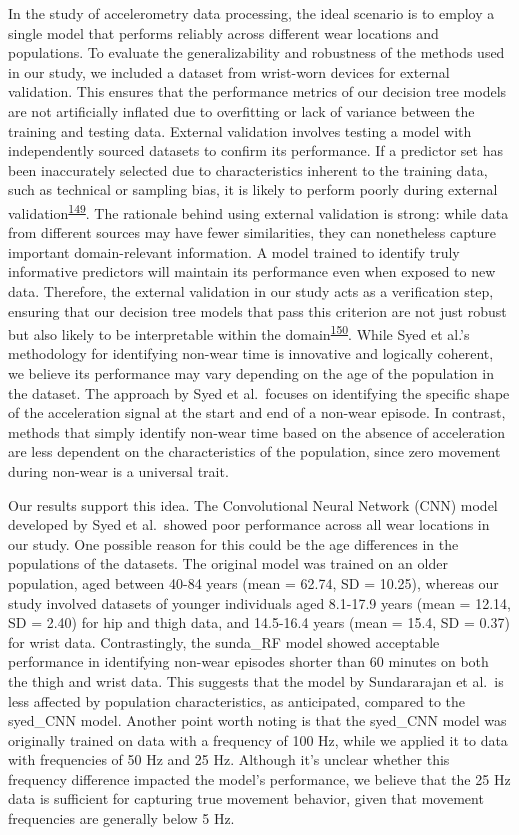 \documentclass[
  10pt,
]{scrbook}
\begin{document}
In the study of accelerometry data processing, the ideal scenario is to
employ a single model that performs reliably across different wear
locations and populations. To evaluate the generalizability and
robustness of the methods used in our study, we included a dataset from
wrist-worn devices for external validation. This ensures that the
performance metrics of our decision tree models are not artificially
inflated due to overfitting or lack of variance between the training and
testing data. External validation involves testing a model with
independently sourced datasets to confirm its performance. If a
predictor set has been inaccurately selected due to characteristics
inherent to the training data, such as technical or sampling bias, it is
likely to perform poorly during external
validation\textsuperscript{\protect\hyperlink{ref-steyerberg_prediction_2016}{149}}.
The rationale behind using external validation is strong: while data
from different sources may have fewer similarities, they can nonetheless
capture important domain-relevant information. A model trained to
identify truly informative predictors will maintain its performance even
when exposed to new data. Therefore, the external validation in our
study acts as a verification step, ensuring that our decision tree
models that pass this criterion are not just robust but also likely to
be interpretable within the
domain\textsuperscript{\protect\hyperlink{ref-altman_prognosis_2009}{150}}.
While Syed et al.'s methodology for identifying non-wear time is
innovative and logically coherent, we believe its performance may vary
depending on the age of the population in the dataset. The approach by
Syed et al.~focuses on identifying the specific shape of the
acceleration signal at the start and end of a non-wear episode. In
contrast, methods that simply identify non-wear time based on the
absence of acceleration are less dependent on the characteristics of the
population, since zero movement during non-wear is a universal trait.

Our results support this idea. The Convolutional Neural Network (CNN)
model developed by Syed et al.~showed poor performance across all wear
locations in our study. One possible reason for this could be the age
differences in the populations of the datasets. The original model was
trained on an older population, aged between 40-84 years (mean = 62.74,
SD = 10.25), whereas our study involved datasets of younger individuals
aged 8.1-17.9 years (mean = 12.14, SD = 2.40) for hip and thigh data,
and 14.5-16.4 years (mean = 15.4, SD = 0.37) for wrist data.
Contrastingly, the sunda\_RF model showed acceptable performance in
identifying non-wear episodes shorter than 60 minutes on both the thigh
and wrist data. This suggests that the model by Sundararajan et al.~is
less affected by population characteristics, as anticipated, compared to
the syed\_CNN model. Another point worth noting is that the syed\_CNN
model was originally trained on data with a frequency of 100 Hz, while
we applied it to data with frequencies of 50 Hz and 25 Hz. Although it's
unclear whether this frequency difference impacted the model's
performance, we believe that the 25 Hz data is sufficient for capturing
true movement behavior, given that movement frequencies are generally
below 5 Hz.
\end{document}
